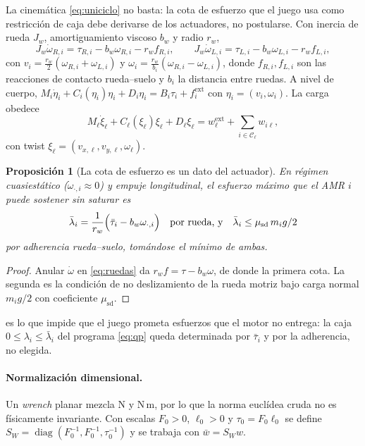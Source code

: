 \documentclass[11pt,a4paper]{article}
\theoremstyle{plain}
\newtheorem{proposicion}[teorema]{Proposición}
\theoremstyle{definition}
\theoremstyle{remark}
\newcommand{\Ccal}{\mathcal{C}}
\begin{document}
La cinemática \eqref{eq:uniciclo} no basta: la cota de esfuerzo que el juego usa
como restricción de caja debe derivarse de los actuadores, no postularse. Con
inercia de rueda $J_w$, amortiguamiento viscoso $b_w$ y radio $r_w$,
\begin{equation}
  J_w\dot\omega_{R,i}=\tau_{R,i}-b_w\omega_{R,i}-r_wf_{R,i},\qquad
  J_w\dot\omega_{L,i}=\tau_{L,i}-b_w\omega_{L,i}-r_wf_{L,i},
  \label{eq:ruedas}
\end{equation}
con
$v_i=\tfrac{r_w}{2}(\omega_{R,i}+\omega_{L,i})$ y
$\omega_i=\tfrac{r_w}{b_i}(\omega_{R,i}-\omega_{L,i})$,
donde $f_{R,i},f_{L,i}$ son las reacciones de contacto rueda--suelo y $b_i$ la
distancia entre ruedas. A nivel de cuerpo,
$M_i\dot\eta_i+C_i(\eta_i)\eta_i+D_i\eta_i=B_i\tau_i+f_i^{\mathrm{ext}}$
con $\eta_i=(v_i,\omega_i)$. La carga obedece
\begin{equation}
  M_\ell\dot\xi_\ell+C_\ell(\xi_\ell)\xi_\ell+D_\ell\xi_\ell
  =w_\ell^{\mathrm{ext}}+\sum_{i\in\Ccal_\ell}w_{i\ell},
  \label{eq:carga}
\end{equation}
con twist $\xi_\ell=(v_{x,\ell},v_{y,\ell},\omega_\ell)$.

\begin{proposicion}[La cota de esfuerzo es un dato del actuador]
\label{pr:cota}
En régimen cuasiestático ($\dot\omega_{\cdot,i}\approx0$) y empuje longitudinal,
el esfuerzo máximo que el AMR $i$ puede sostener sin saturar es
\[
  \bar\lambda_i
  =\frac{1}{r_w}\Bigl(\bar\tau_i-b_w\omega_{\cdot,i}\Bigr)
  \quad\text{por rueda, y}\quad
  \bar\lambda_i\le\mu_{\mathrm{sd}}\,m_ig/2
\]
por adherencia rueda--suelo, tomándose el mínimo de ambas.
\end{proposicion}

\begin{proof}
Anular $\dot\omega$ en \eqref{eq:ruedas} da $r_wf=\tau-b_w\omega$, de donde la
primera cota. La segunda es la condición de no deslizamiento de la rueda motriz
bajo carga normal $m_ig/2$ con coeficiente $\mu_{\mathrm{sd}}$.
\end{proof}

 es lo que impide que el juego prometa esfuerzos que el motor no
entrega: la caja $0\le\lambda_i\le\bar\lambda_i$ del programa \eqref{eq:qp}
queda determinada por $\bar\tau_i$ y por la adherencia, no elegida.

\paragraph{Normalización dimensional.} Un \emph{wrench} planar mezcla N y N\,m,
por lo que la norma euclídea cruda no es físicamente invariante. Con escalas
$F_0>0$, $\ell_0>0$ y $\tau_0=F_0\ell_0$ se define
$S_W=\operatorname{diag}(F_0^{-1},F_0^{-1},\tau_0^{-1})$ y se trabaja con
$\bar w=S_Ww$.
\end{document}
